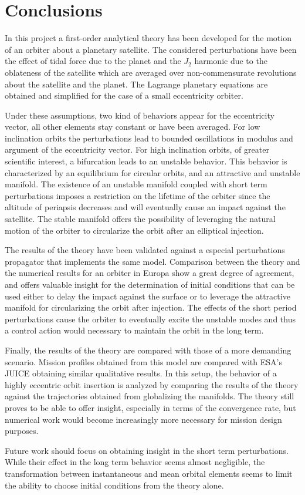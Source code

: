 \section{Conclusions}

In this project a first-order analytical theory has been developed for the motion of an orbiter about a planetary satellite. The considered perturbations have been the effect of tidal force due to the planet and the $J_2$ harmonic due to the oblateness of the satellite which are averaged over non-commensurate revolutions about the satellite and the planet. The Lagrange planetary equations are obtained and simplified for the case of a small eccentricity orbiter. 

Under these assumptions, two kind of behaviors appear for the eccentricity vector, all other elements stay constant or have been averaged. For low inclination orbits the perturbations lead to bounded oscillations in modulus and argument of the eccentricity vector. For high inclination orbits, of greater scientific interest, a bifurcation leads to an unstable behavior. This behavior is characterized by an equilibrium for circular orbits, and an attractive and unstable manifold. The existence of an unstable manifold coupled with short term perturbations imposes a restriction on the lifetime of the orbiter since the altitude of periapsis decreases and will eventually cause an impact against the satellite. The stable manifold offers the possibility of leveraging the natural motion of the orbiter to circularize the orbit after an elliptical injection.

The results of the theory have been validated against a especial perturbations propagator that implements the same model. Comparison between the theory and the numerical results for an orbiter in Europa show a great degree of agreement, and offers valuable insight for the determination of initial conditions that can be used either to delay the impact against the surface or to leverage the attractive manifold for circularizing the orbit after injection. The effects of the short period perturbations cause the orbiter to eventually excite the unstable modes and thus a control action would necessary to maintain the orbit in the long term.

Finally, the results of the theory are compared with those of a more demanding scenario. Mission profiles obtained from this model are compared with ESA's JUICE obtaining similar qualitative results. In this setup, the behavior of a highly eccentric orbit insertion is analyzed by comparing the results of the theory against the trajectories obtained from globalizing the manifolds. The theory still proves to be able to offer insight, especially in terms of the convergence rate, but numerical work would become increasingly more necessary for mission design purposes.

Future work should focus on obtaining insight in the short term perturbations. While their effect in the long term behavior seems almost negligible, the transformation between instantaneous and mean orbital elements seems to limit the ability to choose initial conditions from the theory alone.